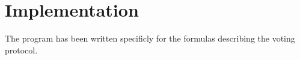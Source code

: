 \chapter{Implementation}
\label{04}


The program has been written specificly for the formulas describing the voting protocol. 



